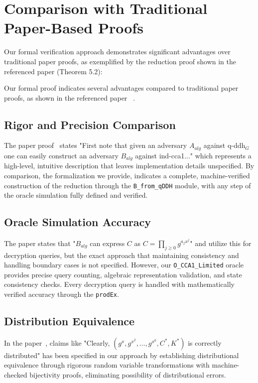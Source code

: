 \section{Comparison with Traditional Paper-Based Proofs}

Our formal verification approach demonstrates significant advantages over traditional paper proofs, as exemplified by the reduction proof shown in the referenced paper (Theorem 5.2):






Our formal proof indicates several advantages compared to traditional paper proofs, as shown in the referenced paper ~\cite{fuchsbauer2018}.




\subsection{Rigor and Precision Comparison}

The paper proof~\cite{fuchsbauer2018} states "First note that given an adversary $A_{alg}$ against q-ddh$_G$ one can easily construct an adversary $B_{alg}$ against ind-cca1..." which represents a high-level, intuitive description that leaves implementation details unspecified. By comparison, the formalization we provide, indicates a complete, machine-verified construction of the reduction through the \texttt{B\_from\_qDDH} module, with any step of the oracle simulation fully defined and verified.

\subsection{Oracle Simulation Accuracy}

The paper states that "$B_{alg}$ can express $C$ as $C = \prod_{j \geq 0} g^{a_j x^j}$" and utilize this for decryption queries, but the exact approach that maintaining consistency and handling boundary cases is not specified. However, our \texttt{O\_CCA1\_Limited} oracle provides precise query counting, algebraic representation validation, and state consistency checks. Every decryption query is handled with mathematically verified accuracy through the \texttt{prodEx}.

\subsection{Distribution Equivalence}

In the paper~\cite{fuchsbauer2018}, claims like "Clearly, $(g^x, g^{x^2}, \ldots, g^{x^q}, C^*, K^*)$ is correctly distributed" has been specified in our approach by establishing distributional equivalence through rigorous random variable transformations with machine-checked bijectivity proofs, eliminating possibility of distributional errors.

